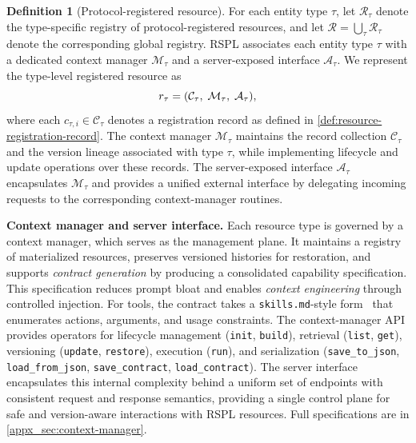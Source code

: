 \documentclass{article}
\theoremstyle{plain}
\theoremstyle{definition}
\newtheorem{definition}[theorem]{Definition}
\theoremstyle{remark}
\begin{document}
\begin{definition}[Protocol-registered resource]
\label{def:protocol-registered-resource}
For each entity type $\tau$, let $\mathcal{R}_\tau$ denote the type-specific registry of protocol-registered resources, and let $\mathcal{R} = \bigcup_{\tau}\mathcal{R}_\tau$ denote the corresponding global registry. RSPL associates each entity type $\tau$ with a dedicated context manager $\mathcal{M}_\tau$ and a server-exposed interface $\mathcal{A}_\tau$. We represent the type-level registered resource as
\begin{equation}
\footnotesize
r_{\tau} = (\mathcal{C}_\tau,\; \mathcal{M}_\tau,\; \mathcal{A}_\tau),
\end{equation}
where each $c_{\tau,i} \in \mathcal{C}_\tau$ denotes a registration record as defined in \cref{def:resource-registration-record}. The context manager $\mathcal{M}_\tau$ maintains the record collection $\mathcal{C}_\tau$ and the version lineage associated with type $\tau$, while implementing lifecycle and update operations over these records. The server-exposed interface $\mathcal{A}_\tau$ encapsulates $\mathcal{M}_\tau$ and provides a unified external interface by delegating incoming requests to the corresponding context-manager routines.
\end{definition}

\textbf{Context manager and server interface.} Each resource type is governed by a context manager, which serves as the management plane. It maintains a registry of materialized resources, preserves versioned histories for restoration, and supports \emph{contract generation} by producing a consolidated capability specification. This specification reduces prompt bloat and enables \emph{context engineering} through controlled injection. For tools, the contract takes a \texttt{skills.md}-style form~\citep{anthropic2025agentskills} that enumerates actions, arguments, and usage constraints. The context-manager API provides operators for lifecycle management (\texttt{init}, \texttt{build}), retrieval (\texttt{list}, \texttt{get}), versioning (\texttt{update}, \texttt{restore}), execution (\texttt{run}), and serialization (\texttt{save\_to\_json}, \texttt{load\_from\_json}, \texttt{save\_contract}, \texttt{load\_contract}). The server interface encapsulates this internal complexity behind a uniform set of endpoints with consistent request and response semantics, providing a single control plane for safe and version-aware interactions with RSPL resources. Full specifications are in \cref{appx_sec:context-manager}.
\end{document}
